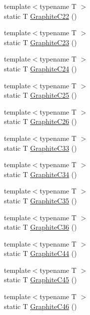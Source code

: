 \begin{DoxyCompactItemize}
\item 
{\footnotesize template$<$typename T $>$ }\\static T \mbox{\hyperlink{namespacempc_1_1data_af3e827952f3b75b2daf52a80fc24f29a}{Graphite\+C22}} ()
\item 
{\footnotesize template$<$typename T $>$ }\\static T \mbox{\hyperlink{namespacempc_1_1data_ade576db0f4f6bafed6825faa5ac3ea3e}{Graphite\+C23}} ()
\item 
{\footnotesize template$<$typename T $>$ }\\static T \mbox{\hyperlink{namespacempc_1_1data_aadafb2d8d5d027e4605607b5e89ed6ef}{Graphite\+C24}} ()
\item 
{\footnotesize template$<$typename T $>$ }\\static T \mbox{\hyperlink{namespacempc_1_1data_a7664c698301f74e6197b8b0aa6057d74}{Graphite\+C25}} ()
\item 
{\footnotesize template$<$typename T $>$ }\\static T \mbox{\hyperlink{namespacempc_1_1data_a8a038df138f6aff4ae28dc88e2281307}{Graphite\+C26}} ()
\item 
{\footnotesize template$<$typename T $>$ }\\static T \mbox{\hyperlink{namespacempc_1_1data_a84dbadf0d0d8f6abb5386581636d41f9}{Graphite\+C33}} ()
\item 
{\footnotesize template$<$typename T $>$ }\\static T \mbox{\hyperlink{namespacempc_1_1data_a485935138ffb575847d389484893b71f}{Graphite\+C34}} ()
\item 
{\footnotesize template$<$typename T $>$ }\\static T \mbox{\hyperlink{namespacempc_1_1data_a04230c73f219d33fa44bf8178e66a867}{Graphite\+C35}} ()
\item 
{\footnotesize template$<$typename T $>$ }\\static T \mbox{\hyperlink{namespacempc_1_1data_ab3b5e78d5e1450703649dd9da0454142}{Graphite\+C36}} ()
\item 
{\footnotesize template$<$typename T $>$ }\\static T \mbox{\hyperlink{namespacempc_1_1data_a9f8078dc5ecdf1e60790dc571a86ef1c}{Graphite\+C44}} ()
\item 
{\footnotesize template$<$typename T $>$ }\\static T \mbox{\hyperlink{namespacempc_1_1data_af0769b55ee5537149e740437ecdf220c}{Graphite\+C45}} ()
\item 
{\footnotesize template$<$typename T $>$ }\\static T \mbox{\hyperlink{namespacempc_1_1data_a3a040f5f3730d284f8c12ffd21e1f09b}{Graphite\+C46}} ()

\end{DoxyCompactItemize}
